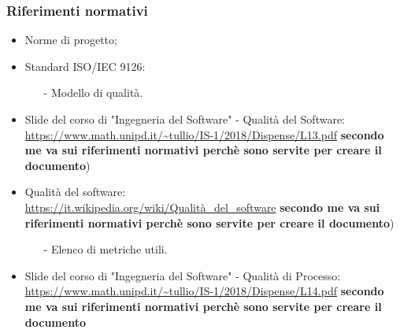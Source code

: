  \subsubsection{Riferimenti normativi}
 \begin{itemize}
 	\item Norme di progetto;
 	\item Standard ISO/IEC 9126:
 		\begin{itemize}
 			\item[-] Modello di qualità.
 		\end{itemize}
	\item Slide del corso di "Ingegneria del Software" - Qualità del Software: \\
		\url{https://www.math.unipd.it/~tullio/IS-1/2018/Dispense/L13.pdf} \textbf{secondo me va sui riferimenti normativi perchè sono servite per creare il documento})
	\item Qualità del software: \\
		\url{https://it.wikipedia.org/wiki/Qualità_del_software} \textbf{secondo me va sui riferimenti normativi perchè sono servite per creare il documento})
		\begin{itemize}
			\item[-] Elenco di metriche utili.
		\end{itemize} 
	\item  Slide del corso di "Ingegneria del Software" - Qualità di Processo: \\
		\url {https://www.math.unipd.it/~tullio/IS-1/2018/Dispense/L14.pdf}  \textbf{secondo me va sui riferimenti normativi perchè sono servite per creare il documento}
 \end{itemize}

